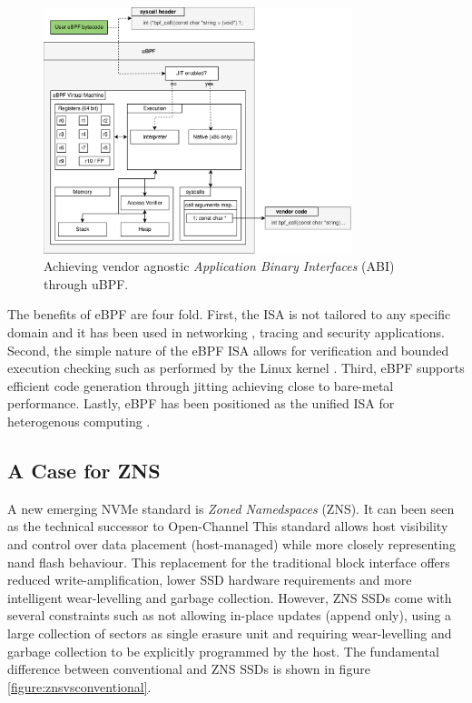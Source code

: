 \begin{figure}
    \centering
	\includegraphics[width=0.8\textwidth]{resources/images/ubpf-abi.pdf}
	\caption{Achieving vendor agnostic \textit{Application Binary Interfaces}
        (ABI) through uBPF.}
    \label{figure:ubpf-abi}
\end{figure}

The benefits of eBPF are four fold. First, the ISA is not tailored to any
specific domain and it has been used in networking \cite{xdp},
tracing \cite{enhanced-ebpf} and security \cite{seccomp} applications. Second,
the simple nature of the eBPF ISA allows for verification and bounded execution
checking such as performed by the Linux kernel \cite{kern-analysis}. Third, eBPF
supports efficient code generation through jitting achieving close to bare-metal
performance. Lastly, eBPF has been positioned as the unified ISA for
heterogenous computing \cite{Brunella2020hXDPES, bpf-uapi}.

\subsection{A Case for ZNS}

A new emerging NVMe standard is \textit{Zoned Namedspaces} (ZNS). It can been
seen as the technical successor to Open-Channel %
This standard allows host visibility and control over data placement
(host-managed) while more closely representing nand flash behaviour. This
replacement for the traditional block interface offers reduced
write-amplification, lower SSD hardware requirements and more intelligent
wear-levelling and garbage collection. However, ZNS SSDs come with several
constraints such as not allowing in-place updates (append only), using a large
collection of sectors as single erasure unit and requiring wear-levelling and
garbage collection to be explicitly programmed by the host. The fundamental
difference between conventional and ZNS SSDs is shown in figure
\ref{figure:znsvsconventional}.

